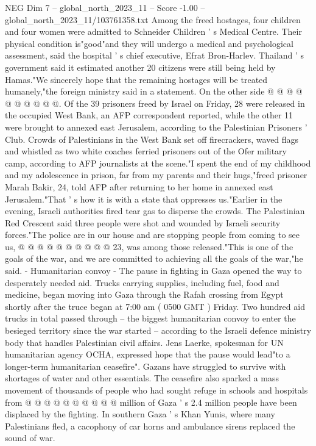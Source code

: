 \begin{textsample}{NEG Dim 7 – global\_north\_2023\_11 – Score -1.00 – global\_north\_2023\_11/103761358.txt}
Among the freed hostages, four children and four women were admitted to Schneider Children ' s Medical Centre.
Their physical condition is"good"and they will undergo a medical and psychological assessment, said the hospital ' s chief executive, Efrat Bron-Harlev.
Thailand ' s government said it estimated another 20 citizens were still being held by Hamas."We sincerely hope that the remaining hostages will be treated humanely,"the foreign ministry said in a statement.
On the other side @ @ @ @ @ @ @ @ @ @.
Of the 39 prisoners freed by Israel on Friday, 28 were released in the occupied West Bank, an AFP correspondent reported, while the other 11 were brought to annexed east Jerusalem, according to the Palestinian Prisoners ' Club.
Crowds of Palestinians in the West Bank set off firecrackers, waved flags and whistled as two white coaches ferried prisoners out of the Ofer military camp, according to AFP journalists at the scene."I spent the end of my childhood and my adolescence in prison, far from my parents and their hugs,"freed prisoner Marah Bakir, 24, told AFP after returning to her home in annexed east Jerusalem."That ' s how it is with a state that oppresses us."Earlier in the evening, Israeli authorities fired tear gas to disperse the crowds.
The Palestinian Red Crescent said three people were shot and wounded by Israeli security forces."The police are in our house and are stopping people from coming to see us, @ @ @ @ @ @ @ @ @ @ 23, was among those released."This is one of the goals of the war, and we are committed to achieving all the goals of the war,"he said. - Humanitarian convoy - The pause in fighting in Gaza opened the way to desperately needed aid.
Trucks carrying supplies, including fuel, food and medicine, began moving into Gaza through the Rafah crossing from Egypt shortly after the truce began at 7:00 am ( 0500 GMT ) Friday.
Two hundred aid trucks in total passed through -- the biggest humanitarian convoy to enter the besieged territory since the war started -- according to the Israeli defence ministry body that handles Palestinian civil affairs.
Jens Laerke, spokesman for UN humanitarian agency OCHA, expressed hope that the pause would lead"to a longer-term humanitarian ceasefire".
Gazans have struggled to survive with shortages of water and other essentials.
The ceasefire also sparked a mass movement of thousands of people who had sought refuge in schools and hospitals from @ @ @ @ @ @ @ @ @ @ million of Gaza ' s 2.4 million people have been displaced by the fighting.
In southern Gaza ' s Khan Yunis, where many Palestinians fled, a cacophony of car horns and ambulance sirens replaced the sound of war.

\end{textsample}
